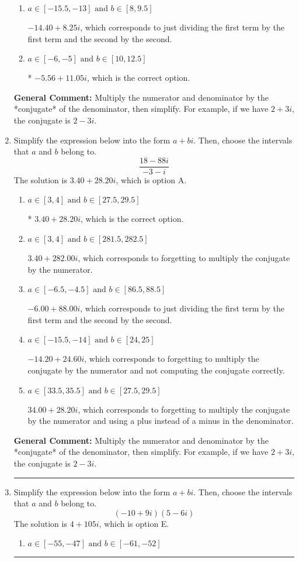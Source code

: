 \documentclass{extbook}[14pt]
\newcommand{\litem}[1]{\item #1

\rule{\textwidth}{0.4pt}}
\begin{document}
\begin{enumerate}
{\begin{enumerate}[label=\Alph*.]
 $-5.56  + 453.00 i$, which corresponds to forgetting to multiply the conjugate by the numerator.
\item \( a \in [-15.5, -13] \text{ and } b \in [8, 9.5] \)

 $-14.40  + 8.25 i$, which corresponds to just dividing the first term by the first term and the second by the second.
\item \( a \in [-6, -5] \text{ and } b \in [10, 12.5] \)

* $-5.56  + 11.05 i$, which is the correct option.
\end{enumerate}

\textbf{General Comment:} Multiply the numerator and denominator by the *conjugate* of the denominator, then simplify. For example, if we have $2+3i$, the conjugate is $2-3i$.
}
\litem{
Simplify the expression below into the form $a+bi$. Then, choose the intervals that $a$ and $b$ belong to.
\[ \frac{18 - 88 i}{-3 - i} \]The solution is \( 3.40  + 28.20 i \), which is option A.\begin{enumerate}[label=\Alph*.]
\item \( a \in [3, 4] \text{ and } b \in [27.5, 29.5] \)

* $3.40  + 28.20 i$, which is the correct option.
\item \( a \in [3, 4] \text{ and } b \in [281.5, 282.5] \)

 $3.40  + 282.00 i$, which corresponds to forgetting to multiply the conjugate by the numerator.
\item \( a \in [-6.5, -4.5] \text{ and } b \in [86.5, 88.5] \)

 $-6.00  + 88.00 i$, which corresponds to just dividing the first term by the first term and the second by the second.
\item \( a \in [-15.5, -14] \text{ and } b \in [24, 25] \)

 $-14.20  + 24.60 i$, which corresponds to forgetting to multiply the conjugate by the numerator and not computing the conjugate correctly.
\item \( a \in [33.5, 35.5] \text{ and } b \in [27.5, 29.5] \)

 $34.00  + 28.20 i$, which corresponds to forgetting to multiply the conjugate by the numerator and using a plus instead of a minus in the denominator.
\end{enumerate}

\textbf{General Comment:} Multiply the numerator and denominator by the *conjugate* of the denominator, then simplify. For example, if we have $2+3i$, the conjugate is $2-3i$.
}
\litem{
Simplify the expression below into the form $a+bi$. Then, choose the intervals that $a$ and $b$ belong to.
\[ (-10 + 9 i)(5 - 6 i) \]The solution is \( 4 + 105 i \), which is option E.\begin{enumerate}[label=\Alph*.]
\item \( a \in [-55, -47] \text{ and } b \in [-61, -52] \)


\end{enumerate}}
\end{enumerate}
\end{document}
